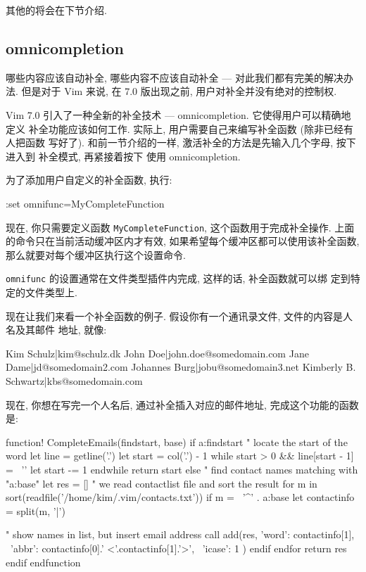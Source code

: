 其他的将会在下节介绍.

\subsection{omnicompletion}
\label{subsec:omnicompletion}

哪些内容应该自动补全, 哪些内容不应该自动补全 --- 对此我们都有完美的解决办法.
但是对于 Vim 来说, 在 7.0 版出现之前, 用户对补全并没有绝对的控制权.

Vim 7.0 引入了一种全新的补全技术 --- omnicompletion. 它使得用户可以精确地定义
补全功能应该如何工作. 实际上, 用户需要自己来编写补全函数 (除非已经有人把函数
写好了).
和前一节介绍的一样, 激活补全的方法是先输入几个字母, 按下  进入到
补全模式, 再紧接着按下  使用 omnicompletion.

为了添加用户自定义的补全函数, 执行:
\begin{vimcode}
:set omnifunc=MyCompleteFunction
\end{vimcode}
现在, 你只需要定义函数 \texttt{MyCompleteFunction}, 这个函数用于完成补全操作.
上面的命令只在当前活动缓冲区内才有效, 如果希望每个缓冲区都可以使用该补全函数,
那么就要对每个缓冲区执行这个设置命令.
\begin{warning}
    \texttt{omnifunc} 的设置通常在文件类型插件内完成, 这样的话, 补全函数就可以绑
    定到特定的文件类型上.
\end{warning}

现在让我们来看一个补全函数的例子. 假设你有一个通讯录文件, 文件的内容是人名及其邮件
地址, 就像:
\begin{vimcode}
Kim Schulz|kim@schulz.dk
John Doe|john.doe@somedomain.com
Jane Dame|jd@somedomain2.com
Johannes Burg|jobu@somedomain3.net
Kimberly B. Schwartz|kbs@somedomain.com
\end{vimcode}

现在, 你想在写完一个人名后, 通过补全插入对应的邮件地址, 完成这个功能的函数是:
\begin{vimcode}
function! CompleteEmails(findstart, base)
	  if a:findstart
	    " locate the start of the word
	    let line = getline('.')
	    let start = col('.') - 1
	    while start > 0 && line[start - 1] =~ '\a'
	      let start -= 1
	    endwhile
	    return start
	  else
	    " find contact names matching with "a:base"
	    let res = []
		 " we read contactlist file and sort the result
	    for m in sort(readfile('/home/kim/.vim/contacts.txt'))
	      if m =~ '^' . a:base
				let contactinfo = split(m, '|')
\end{vimcode}
\begin{vimcode}
		      " show names in list, but insert email address 
		      call add(res, {'word': contactinfo[1], 
                     \ 'abbr': contactinfo[0].' <'.contactinfo[1].'>',
                 \ 'icase': 1} )
	      endif
	    endfor
	    return res
	  endif
	endfunction
\end{vimcode}


